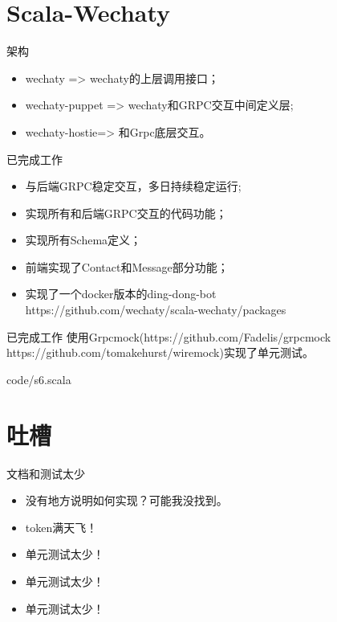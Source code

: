 \documentclass[10pt,aspectratio=43,mathserif,table]{beamer}
\begin{document}
\section{Scala-Wechaty}
\begin{frame}{架构}
  \begin{itemize}
    \item<1-> wechaty => wechaty的上层调用接口；
    \item<1-> wechaty-puppet => wechaty和GRPC交互中间定义层;
    \item<1-> wechaty-hostie=> 和Grpc底层交互。
  \end{itemize}
\end{frame}
\begin{frame}{已完成工作}
  \begin{itemize}
    \item<1-> 与后端GRPC稳定交互，多日持续稳定运行;
    \item<1-> 实现所有和后端GRPC交互的代码功能；
    \item<1-> 实现所有Schema定义；
    \item<1-> 前端实现了Contact和Message部分功能；
    \item<1-> 实现了一个docker版本的ding-dong-bot\\https://github.com/wechaty/scala-wechaty/packages
  \end{itemize}
\end{frame}
\begin{frame}{已完成工作}
    使用Grpcmock(https://github.com/Fadelis/grpcmock https://github.com/tomakehurst/wiremock)实现了单元测试。
  
  {code/s6.scala}
\end{frame}

\section{吐槽}
\begin{frame}{文档和测试太少}
  \begin{itemize}
    \item<1-> 没有地方说明如何实现？可能我没找到。
    \item<1-> token满天飞！
    \item<1-> 单元测试太少！
    \item<1-> 单元测试太少！
    \item<1-> 单元测试太少！
  \end{itemize}
\end{frame}
\end{document}
